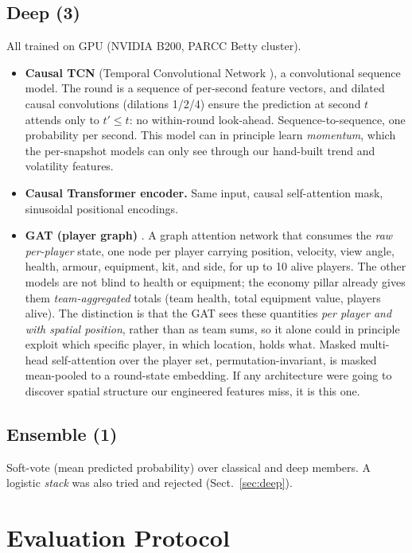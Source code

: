 \documentclass[11pt,a4paper]{article}
\begin{document}
\subsection{Deep (3)}
All trained on GPU (NVIDIA B200, PARCC Betty cluster).

\begin{itemize}
  \item \textbf{Causal TCN} (Temporal Convolutional Network \cite{bai2018tcn}), a
    convolutional sequence model. The round is a sequence of per-second feature vectors, and
    dilated causal convolutions (dilations 1/2/4) ensure the prediction at second $t$ attends
    only to $t' \le t$: no within-round look-ahead. Sequence-to-sequence, one probability per
    second. This model can in principle learn \emph{momentum}, which the per-snapshot models can
    only see through our hand-built trend and volatility features.
  \item \textbf{Causal Transformer encoder.} Same input, causal self-attention mask,
    sinusoidal positional encodings.
  \item \textbf{GAT (player graph)} \cite{velickovic2018gat}. A graph attention network that
    consumes the \emph{raw per-player} state, one node per player carrying position, velocity,
    view angle, health, armour, equipment, kit, and side, for up to 10 alive players. The other
    models are not blind to health or equipment; the economy pillar already gives them
    \emph{team-aggregated} totals (team health, total equipment value, players alive). The
    distinction is that the GAT sees these quantities \emph{per player and with spatial
    position}, rather than as team sums, so it alone could in principle exploit which specific
    player, in which location, holds what. Masked multi-head self-attention over the player set,
    permutation-invariant, is masked mean-pooled to a round-state embedding. If any architecture
    were going to discover spatial structure our engineered features miss, it is this one.
\end{itemize}

\subsection{Ensemble (1)}
Soft-vote (mean predicted probability) over classical and deep members. A logistic
\emph{stack} was also tried and rejected (Sect.~\ref{sec:deep}).

\section{Evaluation Protocol}
\label{sec:protocol}
\end{document}
